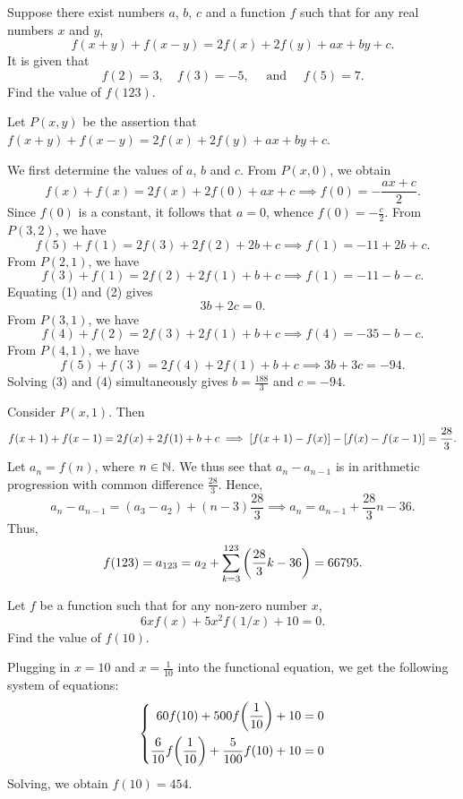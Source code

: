\begin{question}[66795]\label{Q::2023-S-1-23}
    Suppose there exist numbers $a$, $b$, $c$ and a function $f$ such that for any real numbers $x$ and $y$, \[f(x + y) + f(x - y) = 2f(x) + 2f(y) + ax + by + c.\] It is given that \[f(2) = 3, \quad f(3) = -5, \quad \text{ and } \quad f(5) = 7.\] Find the value of $f(123)$.
\end{question}
\begin{solution*}
    Let $P(x, y)$ be the assertion that $f(x + y) + f(x - y) = 2f(x) + 2f(y) + ax + by + c$.
    
    We first determine the values of $a$, $b$ and $c$. From $P(x, 0)$, we obtain \[f(x) + f(x) = 2f(x) + 2f(0) + ax + c \implies f(0) = -\frac{ax+c}{2}.\] Since $f(0)$ is a constant, it follows that $a = 0$, whence $f(0) = -\frac{c}{2}$. From $P(3, 2)$, we have \[f(5) + f(1) = 2f(3) + 2f(2) + 2b + c \implies f(1) = -11 + 2b + c. \tag{1}\] From $P(2, 1)$, we have \[f(3) + f(1) = 2f(2) + 2f(1) + b + c \implies f(1) = -11 - b - c. \tag{2}\] Equating (1) and (2) gives \[3b + 2c = 0. \tag{3}\] From $P(3, 1)$, we have \[f(4) + f(2) = 2f(3) + 2f(1) + b + c \implies f(4) = -35 - b - c.\] From $P(4, 1)$, we have \[f(5) + f(3) = 2f(4) + 2f(1) + b + c \implies 3b + 3c = -94. \tag{4}\] Solving (3) and (4) simultaneously gives $b = \frac{188}{3}$ and $c = -94$.

    Consider $P(x, 1)$. Then \[f(x+1) + f(x-1) = 2f(x) + 2f(1) + b + c \implies \left[ f(x+1) - f(x) \right] - \left[ f(x) - f(x-1) \right] = \frac{28}3.\] Let $a_n = f(n)$, where $n \in \mathbb{N}$. We thus see that $a_n - a_{n-1}$ is in arithmetic progression with common difference $\frac{28}{3}$. Hence, \[a_n - a_{n-1} = (a_3 - a_2) + (n - 3)\frac{28}{3} \implies a_n = a_{n-1} + \frac{28}{3}n - 36.\] Thus, \[f(123) = a_{123} = a_2 + \sum_{k = 3}^{123} \left( \frac{28}{3} k - 36 \right) = 66795.\]
\end{solution*}

\begin{question}[454]\label{Q::2023-S-1-24}
    Let $f$ be a function such that for any non-zero number $x$, \[6xf(x) + 5x^2 f(1/x) + 10 = 0.\] Find the value of $f(10)$.
\end{question}
\begin{solution*}
    Plugging in $x = 10$ and $x = \frac1{10}$ into the functional equation, we get the following system of equations: \[\left\{\begin{aligned}
        60f(10) + 500f{\left( \frac1{10} \right)} + 10 = 0\\
        \frac6{10} f{\left( \frac1{10} \right)} + \frac5{100} f(10) + 10 = 0
    \end{aligned}\right.\] Solving, we obtain $f(10) = 454$.
\end{solution*}

